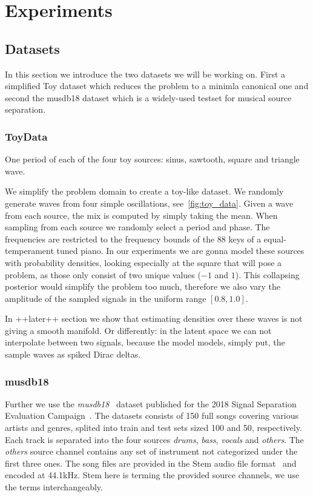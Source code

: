 \chapter{Experiments}%
\label{ch:experiments}

\section{Datasets}
In this section we introduce the two datasets we will be working on. First a simplified Toy dataset which reduces the problem to a minimla canonical one and second the musdb18 dataset which is a widely-used testset for musical source separation.

\subsection{ToyData}
\begin{marginfigure}[5em]
    \resizebox{\textwidth}{!}{%
    }%
    \caption{One period of each of the four toy sources: sinus, sawtooth, square and triangle wave.}%
    \label{fig:toy_data}
\end{marginfigure}

We simplify the problem domain to create a toy-like dataset. We randomly generate waves from four simple oscillations, see~\cref{fig:toy_data}. Given a wave from each source, the mix is computed by simply taking the mean. When sampling from each source we randomly select a period and phase. The frequencies are restricted to the frequency bounds of the 88 keys of a equal-temperament tuned piano. In our experiments we are gonna model these sources with probability densities, looking especially at the square that will pose a problem, as those only consist of two unique values (\(-1\) and \(1\)). This collapsing posterior would simplify the problem too much, therefore we also vary the amplitude of the sampled signals in the uniform range \([0.8, 1.0]\).

In ++later++ section we show that estimating densities over these waves is not giving a smooth manifold. Or differently: in the latent space we can not interpolate between two signals, because the model models, simply put, the sample waves as spiked Dirac deltas.


\subsection{musdb18}
Further we use the \emph{musdb18}~\cite{rafiiMUSDB182017} dataset published for the 2018 Signal Separation Evaluation Campaign~\cite{stoter20182018}. The datasets consists of 150 full songs covering various artists and genres, splited into train and test sets sized 100 and 50, respectively. Each track is separated into the four sources \emph{drums}, \emph{bass}, \emph{vocals} and \emph{others}. The \emph{others} source channel contains any set of instrument not categorized under the first three ones. The song files are provided in the Stem audio file format~\cite{nativeinstrumentsStem} and encoded at 44.1kHz. Stem here is terming the provided source channels, we use the terms interchangeably.

